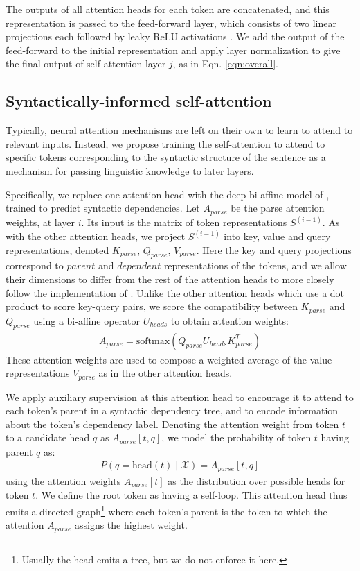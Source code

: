 \documentclass[11pt,a4paper]{article}
\begin{document}
The outputs of all attention heads for each token are concatenated, and this representation is passed to the feed-forward layer, which consists of two linear projections each followed by leaky ReLU activations \citep{maas2012rectifier}. We add the output of the feed-forward to the initial representation and apply layer normalization to give the final output of self-attention layer $j$, as in Eqn. \ref{eqn:overall}.

\subsection{Syntactically-informed self-attention \label{sec:syntax-attn}}
Typically, neural attention mechanisms are left on their own to learn to attend to relevant inputs. Instead, we propose training the self-attention to attend to specific tokens corresponding to the syntactic structure of the sentence as a mechanism for passing linguistic knowledge to later layers. 

Specifically, we replace one attention head with the deep bi-affine model of \citet{dozat2017deep}, trained to predict syntactic dependencies. Let $A_{parse}$ be the parse attention weights, at layer $i$. Its input is the matrix of token representations $S^{(i-1)}$. As with the other attention heads, we project $S^{(i-1)}$ into key, value and query representations, denoted $K_{parse}$, $Q_{parse}$, $V_{parse}$. Here the key and query projections correspond to $parent$ and $dependent$ representations of the tokens, and we allow their dimensions to differ from the rest of the attention heads to more closely follow the implementation of \citet{dozat2017deep}. Unlike the other attention heads which use a dot product to score key-query pairs, we score the compatibility between $K_{parse}$ and $Q_{parse}$ using a bi-affine operator $U_{heads}$ to obtain attention weights:
\begin{align}
A_{parse} = \mathrm{softmax}(Q_{parse} U_{heads} K_{parse}^T)
\end{align}
These attention weights are used to compose a weighted average of the value representations $V_{parse}$ as in the other attention heads.

We apply auxiliary supervision at this attention head to encourage it to attend to each token's parent in a syntactic dependency tree, and to encode information about the token's dependency label. Denoting the attention weight from token $t$ to a candidate head $q$ as $A_{parse}[t,q]$, we model the probability of token $t$ having parent $q$ as:
\begin{align}
P(q=\mathrm{head}(t) \mid \mathcal{X}) = A_{parse}[t, q]
\end{align}
using the attention weights $A_{parse}[t]$ as the distribution over possible heads for token $t$. We define the root token as having a self-loop. This attention head thus emits a directed graph\footnote{Usually the head emits a tree, but we do not enforce it here.} where each token's parent is the token to which the attention $A_{parse}$ assigns the highest weight. 
\end{document}
